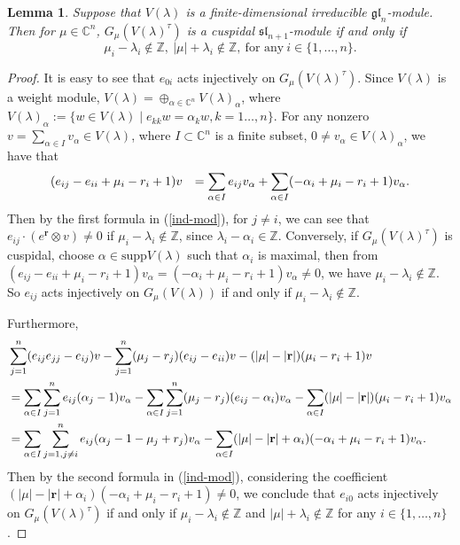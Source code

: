 \documentclass[12pt,a4paper]{amsart}
\newtheorem{lemma}[theorem]{Lemma}%
\numberwithin{equation}{section}
\newcommand{\C}{\mathbb C}
\newcommand{\Z}{\mathbb{Z}}
\def\sl{\mathfrak{sl}}
\def\gl{\mathfrak{gl}}
\def\br{\mathbf{r}}
\def\l{\lambda}
\begin{document}
\begin{lemma}\label{cuspidal-lemm}Suppose that $V(\l)$ is a finite-dimensional
irreducible $\gl_n$-module.
Then for $\mu\in \C^n$, $G_{\mu}(V(\l)^\tau)$ is a cuspidal $\sl_{n+1}$-module  if and only if
\begin{equation}\label{cus-condition}\mu_i-\l_i\not\in \Z,\ |\mu|+\l_i\not\in \Z,\ \text{for any}\
i\in \{1,\dots,n\}.
\end{equation}
\end{lemma}

\begin{proof}
 It is easy to see that $e_{0i}$ acts injectively on $G_\mu(V(\lambda)^\tau)$. Since  $V(\lambda)$ is a weight module, $V(\lambda)=\oplus_{\alpha\in \C^n}V(\lambda)_\alpha$, where $V(\lambda)_\alpha:=\{w \in V(\lambda) \mid e_{kk}w=\alpha_kw, k=1\dots, n\}$.
 For any nonzero $v=\sum_{\alpha \in I }v_{\alpha}\in V(\lambda)$, where $I\subset \C^n$ is a finite subset, $0\neq v_\alpha\in V(\lambda)_\alpha$, we have that
 $$\aligned
& (e_{ij}-e_{ii}+\mu_i-r_i+1)v
&=\sum_{\alpha \in I }e_{ij}v_{\alpha}
+ \sum_{\alpha \in I}(-\alpha_i+\mu_i-r_i+1)v_{\alpha}.
\endaligned$$
  Then by the first formula in (\ref{ind-mod}), for $j\neq i$, we can see that $e_{ij}\cdot (e^{\br}\otimes v)\neq 0$  if  $\mu_i-\l_i\not\in \Z$, since $\l_i-\alpha_i\in \Z$.
  Conversely, if $G_\mu(V(\lambda)^\tau)$ is cuspidal,
  choose $\alpha\in \mathrm{supp}V(\l)$ such that
  $\alpha_i$ is maximal, then from $(e_{ij}-e_{ii}+\mu_i-r_i+1)v_\alpha
=(-\alpha_i+\mu_i-r_i+1)v_{\alpha}\neq 0$, we have $\mu_i-\l_i\not\in \Z$.
  So   $e_{ij}$
acts injectively on $G_\mu(V(\lambda))$ if and only if  $\mu_i-\l_i\not\in \Z$.

 Furthermore,
 $$\aligned &  \sum_{j=1}^n (e_{ij}e_{jj}-e_{ij}) v-\sum_{j=1}^n(\mu_j-r_j) (e_{ij}-e_{ii})v- (|\mu|-|\br|)(\mu_i-r_i+1) v\\
 &=\sum_{\alpha \in I}\sum_{j=1}^n e_{ij}(\alpha_{j}-1) v_\alpha-\sum_{\alpha \in I}\sum_{j=1}^n(\mu_j-r_j) (e_{ij}-\alpha_{i})v_\alpha
 - \sum_{\alpha \in I}(|\mu|-|\br|)(\mu_i-r_i+1) v_\alpha\\
  &=\sum_{\alpha \in I}\sum_{j=1,j\neq i}^n e_{ij}(\alpha_{j}-1-\mu_j+r_j) v_\alpha
- \sum_{\alpha \in I}(|\mu|-|\br|+\alpha_i)(-\alpha_{i}+\mu_i-r_i+1) v_\alpha.
 \endaligned$$
 Then by the second formula in (\ref{ind-mod}), considering the coefficient  $(|\mu|-|\br|+\alpha_i)(-\alpha_{i}+\mu_i-r_i+1) \neq 0$, we conclude that  $e_{i0}$ acts injectively on $G_\mu(V(\lambda)^\tau)$ if and only if
 $\mu_i-\l_i\not\in \Z$ and $|\mu|+\l_i\not\in \Z$ for any
$i\in \{1,\dots,n\}$.
\end{proof}
\end{document}
